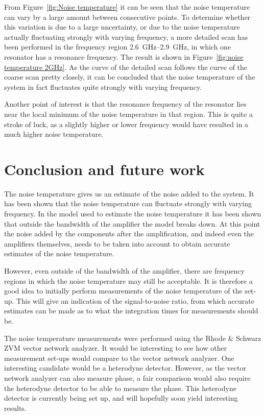 \documentclass[12pt]{report}
\begin{document}
From Figure~\ref{fig:Noise temperature} it can be seen that the noise temperature can vary by a large amount between consecutive points. To determine whether this variation is due to a large uncertainty, or due to the noise temperature actually fluctuating strongly with varying frequency, a more detailed scan has been performed in the frequency region \SIrange{2.6}{2.9}{\giga \hertz}, in which one resonator has a resonance frequency. The result is shown in Figure~\ref{fig:noise temperature 2GHz}. As the curve of the detailed scan follows the curve of the coarse scan pretty closely, it can be concluded that the noise temperature of the system in fact fluctuates quite strongly with varying frequency.

Another point of interest is that the resonance frequency of the resonator lies near the local minimum of the noise temperature in that region. This is quite a stroke of luck, as a slightly higher or lower frequency would have resulted in a much higher noise temperature.



\section{Conclusion and future work}

The noise temperature gives us an estimate of the noise added to the system. It has been shown that the noise temperature can fluctuate strongly with varying frequency. In the model used to estimate the noise temperature it has been shown that outside the bandwidth of the amplifier the model breaks down. At this point the noise added by the components after the amplification, and indeed even the amplifiers themselves, needs to be taken into account to obtain accurate estimates of the noise temperature.

However, even outside of the bandwidth of the amplifier, there are frequency regions in which the noise temperature may still be acceptable. It is therefore a good idea to initially perform measurements of the noise temperature of the set-up. This will give an indication of the signal-to-noise ratio, from which accurate estimates can be made as to what the integration times for measurements should be.

The noise temperature measurements were performed using the Rhode \& Schwarz ZVM vector network analyzer. It would be interesting to see how other measurement set-ups would compare to the vector network analyzer. One interesting candidate would be a heterodyne detector. However, as the vector network analyzer can also measure phase, a fair comparison would also require the heterodyne detector to be able to measure the phase. This heterodyne detector is currently being set up, and will hopefully soon yield interesting results.
\end{document}
